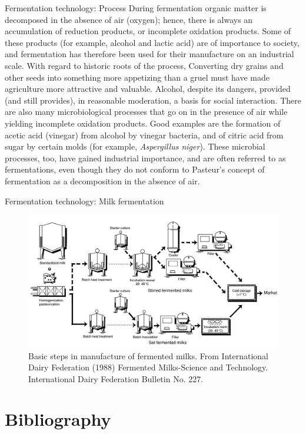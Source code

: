 \documentclass[
  ignorenonframetext,
  aspectratio=169]{beamer}
\begin{document}
\begin{frame}{Fermentation technology: Process}
\protect\hypertarget{fermentation-technology-process}{}
During fermentation organic matter is decomposed
\alert{in the absence of air} (oxygen); hence, there is always an
accumulation of reduction products, or incomplete oxidation products.
Some of these products (for example, alcohol and lactic acid) are of
importance to society, and fermentation has therefore been used for
their manufacture on an industrial scale. With regard to historic roots
of the process, Converting dry grains and other seeds into something
more appetizing than a gruel must have made agriculture more attractive
and valuable. Alcohol, despite its dangers, provided (and still
provides), in reasonable moderation, a basis for social interaction.
There are also many microbiological processes that go on in the presence
of air while yielding incomplete oxidation products. Good examples are
the formation of acetic acid (vinegar) from alcohol by vinegar bacteria,
and of citric acid from sugar by certain molds (for example,
\emph{Aspergillus niger}). These microbial processes, too, have gained
industrial importance, and are often referred to as fermentations, even
though they do not conform to Pasteur's concept of fermentation as a
decomposition in the absence of air.
\end{frame}

\begin{frame}{Fermentation technology: Milk fermentation}
\protect\hypertarget{fermentation-technology-milk-fermentation}{}
\begin{figure}
\includegraphics[width=0.55\linewidth]{../images/milk_fermentation} \caption{Basic steps in manufacture of fermented milks. From International Dairy Federation (1988) Fermented Milks-Science and Technology. International Dairy Federation Bulletin No. 227.}\label{fig:milk-fermentation-steps}
\end{figure}
\end{frame}

\hypertarget{bibliography}{%
\section{Bibliography}\label{bibliography}}
\end{document}
